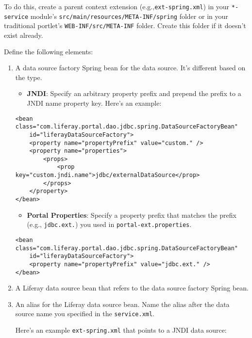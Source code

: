 To do this, create a parent context extension
(e.g.,\texttt{ext-spring.xml}) in your \texttt{*-service} module's
\texttt{src/main/resources/META-INF/spring} folder or in your
traditional portlet's \texttt{WEB-INF/src/META-INF} folder. Create this
folder if it doesn't exist already.

Define the following elements:

\begin{enumerate}
\def\labelenumi{\arabic{enumi}.}
\item
  A data source factory Spring bean for the data source. It's different
  based on the type.

  \begin{itemize}
  \tightlist
  \item
    \textbf{JNDI}: Specify an arbitrary property prefix and prepend the
    prefix to a JNDI name property key. Here's an example:
  \end{itemize}

\begin{verbatim}
<bean class="com.liferay.portal.dao.jdbc.spring.DataSourceFactoryBean"
    id="liferayDataSourceFactory">
    <property name="propertyPrefix" value="custom." />
    <property name="properties">
        <props>
            <prop key="custom.jndi.name">jdbc/externalDataSource</prop>
        </props>
    </property>
</bean>
\end{verbatim}

  \begin{itemize}
  \tightlist
  \item
    \textbf{Portal Properties}: Specify a property prefix that matches
    the prefix (e.g., \texttt{jdbc.ext.}) you used in
    \texttt{portal-ext.properties}.
  \end{itemize}

\begin{verbatim}
<bean class="com.liferay.portal.dao.jdbc.spring.DataSourceFactoryBean"
    id="liferayDataSourceFactory">
    <property name="propertyPrefix" value="jdbc.ext." />
</bean>
\end{verbatim}
\item
  A Liferay data source bean that refers to the data source factory
  Spring bean.
\item
  An alias for the Liferay data source bean. Name the alias after the
  data source name you specified in the \texttt{service.xml}.

  Here's an example \texttt{ext-spring.xml} that points to a JNDI data
  source:


\end{enumerate}

